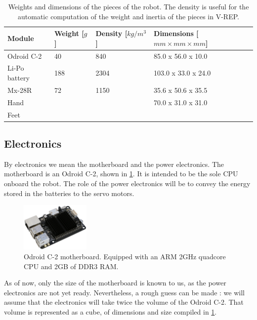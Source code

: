 \begin{table}[htp]
\center
\begin{tabularx}{\textwidth}{@{} l X X l @{}}
\toprule
\textbf{Module} & \textbf{Weight [$g$]} &  \textbf{Density [$kg/m^3$]}& \textbf{Dimensions [$mm \times mm \times mm$]}\\ 
\midrule
Odroid C-2 & 40 & 840 & 85.0 x 56.0 x 10.0\\
Li-Po battery & 188 & 2304 & 103.0 x 33.0 x 24.0\\
Mx-28R & 72 & 1150 & 35.6 x 50.6 x 35.5\\
Hand & & & 70.0 x 31.0 x 31.0\\
Feet & & & \\
\bottomrule
\end{tabularx}
\caption[Weights and dimensions of the pieces of the robot]{Weights and dimensions of the pieces of the robot. The density is useful for the automatic computation of the weight and inertia of the pieces in V-REP.}
\label{table:weights}
\end{table}

\subsection{Electronics}
By electronics we mean the motherboard and the power electronics. The motherboard is an Odroid C-2, shown in \cref{fig:electronics}. It is intended to be the sole CPU onboard the robot. The role of the power electronics will be to convey the energy stored in the batteries to the servo motors. 

\begin{figure}[htp]
\center
\includegraphics[width=0.3\textwidth]{figures/odroid-c2}
\caption{Odroid C-2 motherboard. Equipped with an ARM 2GHz quadcore CPU and 2GB of DDR3 RAM.}
\label{fig:electronics}
\end{figure}

As of now, only the size of the motherboard is known to us, as the power electronics are not yet ready. Nevertheless, a rough guess can be made : we will assume that the electronics will take twice the volume of the Odroid C-2. That volume is represented as a cube, of dimensions and size compiled in \cref{table:weights}.

